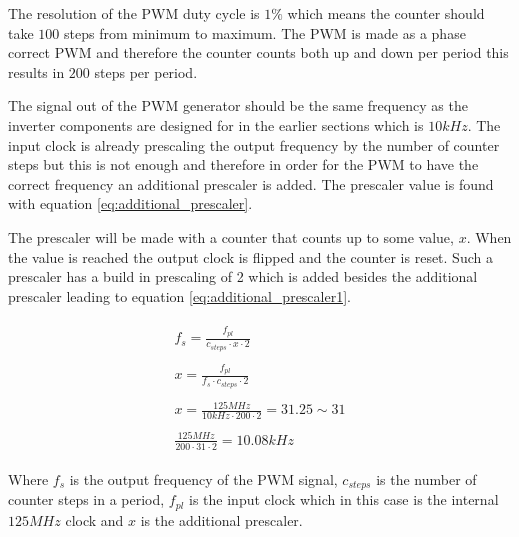 The resolution of the PWM duty cycle is $1\%$ which means the counter should take $100$ steps from minimum to maximum. The PWM is made as a phase correct PWM and therefore the counter counts both up and down per period this results in $200$ steps per period. 

The signal out of the PWM generator should be the same frequency as the inverter components are designed for in the earlier sections which is $10kHz$. The input clock is already prescaling the output frequency by the number of counter steps but this is not enough and therefore in order for the PWM to have the correct frequency an additional prescaler is added. The prescaler value is found with equation \ref{eq:additional_prescaler}.

The prescaler will be made with a counter that counts up to some value, $x$. When the value is reached the output clock is flipped and the counter is reset. Such a prescaler has a build in prescaling of 2 which is added besides the additional prescaler leading to equation \ref{eq:additional_prescaler1}.



\begin{subequations}
    \begin{align}
        \begin{split}
            f_{s} = \frac{f_{pl}}{c_{steps} \cdot x \cdot 2}
            \label{eq:additional_prescaler1}
        \end{split} \\ 
        \begin{split}
             x = \frac{f_{pl}}{f_{s} \cdot c_{steps} \cdot 2}
        \end{split} \\ 
        \begin{split}
            x = \frac{125MHz}{10kHz \cdot 200 \cdot 2} = 31.25 \sim 31
            \label{eq:additional_prescaler}
        \end{split} \\
        \begin{split}
            \frac{125MHz}{200 \cdot 31 \cdot 2} = 10.08kHz
        \end{split}
    \end{align}
\end{subequations}

Where $f_{s}$ is the output frequency of the PWM signal, $c_{steps}$ is the number of counter steps in a period, $f_{pl}$ is the input clock which in this case is the internal $125MHz$ clock and $x$ is the additional prescaler.

